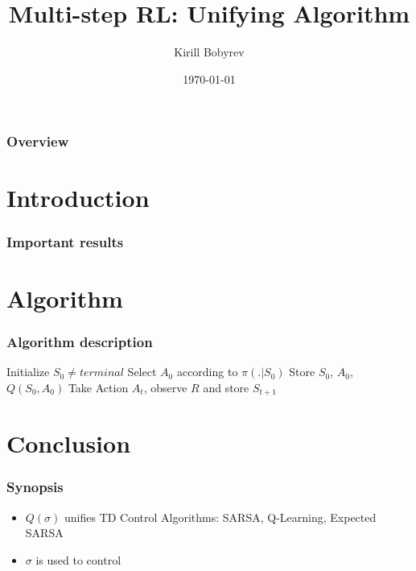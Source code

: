 \documentclass{beamer}
\title{Multi-step RL: Unifying Algorithm}
\author{Kirill Bobyrev}
\date{\today}
\begin{document}
\begin{frame}
\titlepage
\end{frame}

\begin{frame}
\frametitle{Overview}
\tableofcontents
\end{frame}


\section{Introduction}

\begin{frame}
\frametitle{Important results}
\end{frame}

\section{Algorithm}

\begin{frame}
\frametitle{Algorithm description}
\begin{algorithmic}
  \STATE Initialize $S_0 \neq {terminal}$
  \STATE Select $A_0$ according to $\pi(. | S_0)$
  \STATE Store $S_0$, $A_0$, $Q(S_0, A_0)$
      \STATE Take Action $A_t$, observe $R$ and store $S_{t + 1}$
    \ENDIF
  \ENDFOR
\end{algorithmic}
\end{frame}



\section{Conclusion}

\begin{frame}
\frametitle{Synopsis}
\begin{itemize}
    \item $Q(\sigma)$ unifies TD Control Algorithms: SARSA, Q-Learning,
          Expected SARSA
    \item $\sigma$ is used to control
\end{itemize}
\end{frame}
\end{document}
